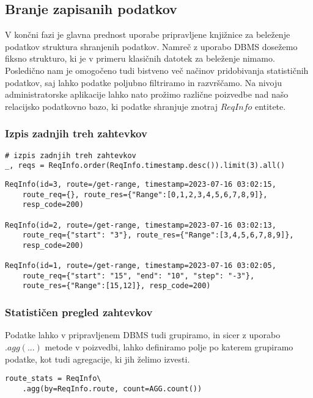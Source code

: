 \documentclass[a4paper,12pt,openright]{book}
\begin{document}
    \subsection{Branje zapisanih podatkov}

    V končni fazi je glavna prednost uporabe pripravljene knjižnice za beleženje podatkov struktura shranjenih podatkov. Namreč z uporabo DBMS dosežemo fiksno strukturo, ki je v primeru klasičnih datotek za beleženje nimamo. Posledično nam je omogočeno tudi bistveno več načinov pridobivanja statističnih podatkov, saj lahko podatke poljubno filtriramo in razvrščamo. Na nivoju administratorske aplikacije lahko nato prožimo različne poizvedbe nad našo relacijsko podatkovno bazo, ki podatke shranjuje znotraj $ReqInfo$ entitete.

    \subsubsection{Izpis zadnjih treh zahtevkov}

\begin{verbatim}
# izpis zadnjih treh zahtevkov
_, reqs = ReqInfo.order(ReqInfo.timestamp.desc()).limit(3).all()
\end{verbatim}

\begin{verbatim}
ReqInfo(id=3, route=/get-range, timestamp=2023-07-16 03:02:15, 
    route_req={}, route_res={"Range":[0,1,2,3,4,5,6,7,8,9]},
    resp_code=200)
    
ReqInfo(id=2, route=/get-range, timestamp=2023-07-16 03:02:13, 
    route_req={"start": "3"}, route_res={"Range":[3,4,5,6,7,8,9]},
    resp_code=200)
    
ReqInfo(id=1, route=/get-range, timestamp=2023-07-16 03:02:05,
    route_req={"start": "15", "end": "10", "step": "-3"},
    route_res={"Range":[15,12]}, resp_code=200)
\end{verbatim}

    \subsubsection{Statističen pregled zahtevkov}

    Podatke lahko v pripravljenem DBMS tudi grupiramo, in sicer z uporabo $.agg(...)$ metode v poizvedbi, lahko definiramo polje po katerem grupiramo podatke, kot tudi agregacije, ki jih želimo izvesti.
    
\begin{verbatim}
route_stats = ReqInfo\
    .agg(by=ReqInfo.route, count=AGG.count())
\end{verbatim}
\end{document}
